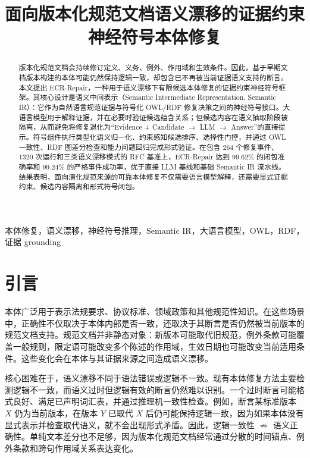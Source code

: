 \documentclass[conference]{IEEEtran}
\title{面向版本化规范文档语义漂移的证据约束神经符号本体修复}
\author{\IEEEauthorblockN{匿名作者}
\IEEEauthorblockA{匿名单位\\
Email: anonymous@example.com}}
\begin{document}
\maketitle

\begin{abstract}
版本化规范文档会持续修订定义、义务、例外、作用域和生效条件。因此，基于早期文档版本构建的本体可能仍然保持逻辑一致，却包含已不再被当前证据语义支持的断言。本文提出 ECR-Repair，一种用于语义漂移下有限候选本体修复的证据约束神经符号框架。其核心设计是语义中间表示（Semantic Intermediate Representation, Semantic IR）：它作为自然语言规范证据与符号化 OWL/RDF 修复决策之间的神经符号接口。大语言模型用于解释证据，并在必要时验证候选蕴含关系；但候选内容在语义抽取阶段被隔离，从而避免将修复退化为“Evidence + Candidate $\rightarrow$ LLM $\rightarrow$ Answer”的直接提示。符号组件执行类型化语义归一化、约束感知候选排序、选择性门控，并通过 OWL 一致性、RDF 图差分检查和能力问题回归完成形式验证。在包含 264 个修复事件、1320 次运行和三类语义漂移模式的 RFC 基准上，ECR-Repair 达到 99.62\% 的闭包准确率和 99.24\% 的严格事件成功率，优于直接 LLM 基线和基础 Semantic IR 流水线。结果表明，面向演化规范来源的可靠本体修复不仅需要语言模型解释，还需要显式证据约束、候选内容隔离和形式符号闭包。
\end{abstract}

\begin{IEEEkeywords}
本体修复，语义漂移，神经符号推理，Semantic IR，大语言模型，OWL，RDF，证据 grounding
\end{IEEEkeywords}

\section{引言}

本体广泛用于表示法规要求、协议标准、领域政策和其他规范性知识。在这些场景中，正确性不仅取决于本体内部是否一致，还取决于其断言是否仍然被当前版本的规范文档支持。规范文档并非静态对象：新版本可能取代旧规范，例外条款可能覆盖一般规则，限定语可能改变多个陈述的作用域，生效日期也可能改变当前适用条件。这些变化会在本体与其证据来源之间造成语义漂移。

核心困难在于，语义漂移不同于语法错误或逻辑不一致。现有本体修复方法主要检测逻辑不一致，而语义过时但逻辑有效的断言仍然难以识别。一个过时断言可能格式良好、满足已声明词汇表，并通过推理机一致性检查。例如，断言某标准版本 $X$ 仍为当前版本，在版本 $Y$ 已取代 $X$ 后仍可能保持逻辑一致，因为如果本体没有显式表示并检查取代语义，就不会出现形式矛盾。因此，逻辑一致性 $\not\Rightarrow$ 语义正确性。单纯文本差分也不足够，因为版本化规范文档经常通过分散的时间锚点、例外条款和跨句作用域关系表达变化。
\end{document}
